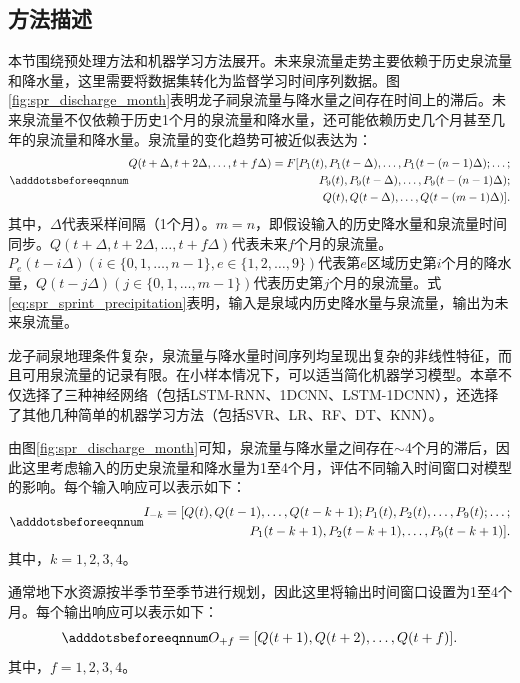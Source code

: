\subsection{方法描述}\label{sec:spr_method}

本节围绕预处理方法和机器学习方法展开。未来泉流量走势主要依赖于历史泉流量和降水量，这里需要将数据集转化为监督学习时间序列数据。图\ref{fig:spr_discharge_month}表明龙子祠泉流量与降水量之间存在时间上的滞后。未来泉流量不仅依赖于历史1个月的泉流量和降水量，还可能依赖历史几个月甚至几年的泉流量和降水量。泉流量的变化趋势可被近似表达为：
\begin{equation}\adddotsbeforeeqnnum
  \label{eq:spr_sprint_precipitation}
  \begin{split}
    Q(t+\Delta,t+2\Delta,\ldots,t+f\Delta)
    =F[P_1(t),P_1(t-\Delta),\ldots,P_1(t-(n-1)\Delta);\ldots;\\
    P_9(t),P_9(t-\Delta),\ldots,P_9(t-(n-1)\Delta);\\
    Q(t),Q(t-\Delta),\ldots,Q(t-(m-1)\Delta)].
  \end{split}
\end{equation}
其中，$\Delta$代表采样间隔（1个月）。$m=n$，即假设输入的历史降水量和泉流量时间同步。$Q(t+\Delta,t+2\Delta,\ldots,t+f\Delta)$代表未来$f$个月的泉流量。$P_e(t-i\Delta)(i\in\{0,1,\ldots,n-1\},e\in\{1,2,\ldots,9\})$代表第$e$区域历史第$i$个月的降水量，$Q(t-j\Delta)(j\in\{0,1,\ldots,m-1\})$代表历史第$j$个月的泉流量。式\ref{eq:spr_sprint_precipitation}表明，输入是泉域内历史降水量与泉流量，输出为未来泉流量。

龙子祠泉地理条件复杂，泉流量与降水量时间序列均呈现出复杂的非线性特征，而且可用泉流量的记录有限。在小样本情况下，可以适当简化机器学习模型。本章不仅选择了三种神经网络（包括LSTM-RNN、1DCNN、LSTM-1DCNN），还选择了其他几种简单的机器学习方法（包括SVR、LR、RF、DT、KNN）。

由图\ref{fig:spr_discharge_month}可知，泉流量与降水量之间存在$\sim$4个月的滞后，因此这里考虑输入的历史泉流量和降水量为1至4个月，评估不同输入时间窗口对模型的影响。每个输入响应可以表示如下：
\begin{equation}\adddotsbeforeeqnnum
  \label{eq:spr_input}
  \begin{split}
    I_{-k}=[Q(t),Q(t-1),\ldots,Q(t-k+1);P_1(t),P_2(t),\ldots,P_9(t);\ldots;\\
    P_1(t-k+1),P_2(t-k+1),\ldots,P_9(t-k+1)].
  \end{split}
\end{equation}
其中，$k=1,2,3,4$。

通常地下水资源按半季节至季节进行规划，因此这里将输出时间窗口设置为1至4个月。每个输出响应可以表示如下：
\begin{equation}\adddotsbeforeeqnnum
  \label{eq:spr_output}
  O_{+f}=[Q(t+1),Q(t+2),\ldots,Q(t+f)].
\end{equation}
其中，$f=1,2,3,4$。

